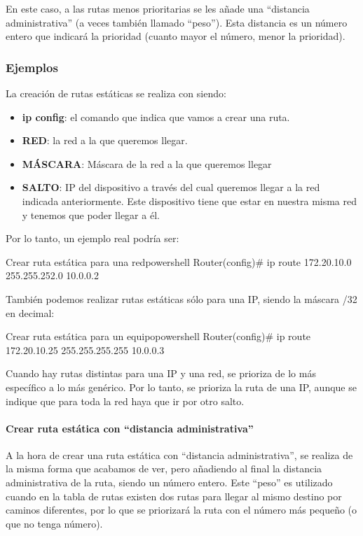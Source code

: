 En este caso, a las rutas menos prioritarias se les añade una “distancia administrativa” (a veces también llamado “peso”). Esta distancia es un número entero que indicará la prioridad (cuanto mayor el número, menor la prioridad).

\subsubsection{Ejemplos}

La creación de rutas estáticas se realiza con  siendo:
\begin{itemize}
    \item \textbf{ip config}: el comando que indica que vamos a crear una ruta.
    \item \textbf{RED}: la  red a la que queremos llegar.
    \item \textbf{MÁSCARA}: Máscara de la red a la que queremos llegar
    \item \textbf{SALTO}: IP del dispositivo a través del cual queremos llegar a la red indicada anteriormente.  Este dispositivo tiene que estar en nuestra misma red y tenemos que poder llegar a él.
\end{itemize}

Por lo tanto, un ejemplo real podría ser:


\begin{mycode}{Crear ruta estática para una red}{powershell}{}
Router(config)# ip route 172.20.10.0  255.255.252.0  10.0.0.2
\end{mycode}

También podemos realizar rutas estáticas sólo para una IP, siendo la máscara /32 en decimal:

\begin{mycode}{Crear ruta estática para un equipo}{powershell}{}
Router(config)# ip route 172.20.10.25  255.255.255.255  10.0.0.3
\end{mycode}

Cuando hay rutas distintas para una IP y una red, se prioriza de lo más específico a lo más genérico. Por lo tanto, se prioriza la ruta de una IP, aunque se indique que para toda la red haya que ir por otro salto.


\paragraph{Crear ruta estática con “distancia administrativa”}
A la hora de crear una ruta estática con “distancia administrativa”, se realiza de la misma forma que acabamos de ver, pero añadiendo al final la distancia administrativa de la ruta, siendo un número entero. Este “peso” es utilizado cuando en la tabla de rutas existen dos rutas para llegar al mismo destino por caminos diferentes, por lo que se priorizará la ruta con el número más pequeño (o que no tenga número).

